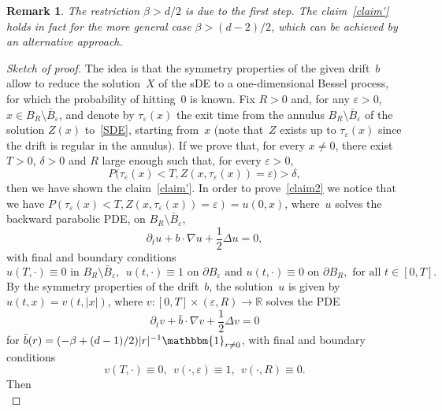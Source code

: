 \documentclass[a4paper,10pt]{article}
\newtheorem{remark}[theorem]{Remark}
\newcommand\1{\mathbbm{1}}
\newcommand{\eps}{\varepsilon}
\numberwithin{equation}{section}
\begin{document}
\begin{remark}
The restriction $\beta>d/2$ is due to the first step. The claim~\eqref{claim'} holds in fact for the more general case $\beta>(d-2)/2$, which can be achieved by an alternative approach.
\end{remark}

\begin{proof}[Sketch of proof]
The idea is that the symmetry properties of the given drift~$b$ allow to reduce the solution~$X$ of the sDE to a one-dimensional Bessel process, for which the probability of hitting~$0$ is known. Fix $R>0$ and, for any $\eps>0$,~$x \in B_R\setminus\bar{B}_\eps$, and denote by $\tau_\eps(x)$ the exit time from the annulus $B_R\setminus\bar{B}_\eps$ of the solution $Z(x)$ to~\eqref{SDE}, starting from~$x$ (note that~$Z$ exists up to $\tau_\eps(x)$ since the drift is regular in the annulus). If we prove that, for every $x\neq0$, there exist $T>0$, $\delta>0$ and $R$ large enough such that, for every $\eps>0$,
\begin{equation}
P\big( \tau_\eps(x)<T,Z(x,\tau_\eps(x))=\eps\big)>\delta ,\label{claim2}
\end{equation}
then we have shown the claim~\eqref{claim'}. In order to prove~\eqref{claim2} we notice that we have $P(\tau_\eps(x)<T,Z(x,\tau_\eps(x))=\eps)=u(0,x)$, where~$u$ solves the backward parabolic PDE, on $B_R\setminus\bar{B}_\eps$,
\begin{equation*}
\partial_tu+b\cdot\nabla u+\frac12\Delta u=0 ,
\end{equation*}
with final and boundary conditions
\begin{equation*}
u(T,\cdot)\equiv0 \text{ in } B_R\setminus\bar{B}_\eps,\ \ u(t,\cdot) \equiv 1 \text{ on } \partial B_\eps \text{ and } 
u(t,\cdot)\equiv 0 \text{ on } \partial B_R, \text{ for all } t \in [0,T].
\end{equation*}
By the symmetry properties of the drift~$b$, the solution~$u$ is given by $u(t,x)=v(t,|x|)$, where $v \colon [0,T]\times(\eps,R)\rightarrow\mathbb{R}$ solves the PDE
\begin{equation*}
\partial_t v+\bar{b}\cdot\nabla v+\frac12\Delta v=0
\end{equation*}
for $\bar{b}(r)=(-\beta+(d-1)/2)|r|^{-1} \1_{r\neq0}$, with final and boundary conditions
\begin{equation*}
v(T,\cdot)\equiv0,\ \ v(\cdot,\eps)\equiv1,\ \ v(\cdot,R)\equiv0 .
\end{equation*}
Then 
\begin{equation}

\end{equation}
\end{proof}
\end{document}

